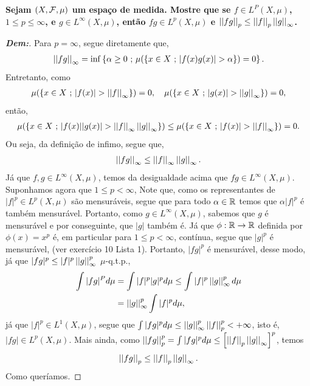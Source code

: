 \textbf{Sejam $(X, \mcal F, \mu)$ um espaço de medida. Mostre que se $f \in L^P(X, \mu)$, $1 \le p \le \infty$, 
e $g \in L^\infty(X, \mu)$, então $fg \in L^p(X, \mu)$ e $\pnorm p {fg} \le \pnorm p f \pnorm \infty g$.}
\begin{proof}[\textbf{Dem:}] Para $p = \infty$, segue diretamente que, 
  \begin{align*}
    \pnorm \infty {fg} = \inf \set{\alpha \ge 0 \st \mu(\set{x \in X \st |f(x)g(x)| > \alpha}) = 0}.
  \end{align*}
  Entretanto, como 
  \begin{align*}
    \mu(\set{x \in X \st |f(x)| > \pnorm \infty f}) = 0, \quad \mu(\set{x \in X \st |g(x)| > \pnorm \infty g}) = 0, 
  \end{align*}
  então, 
  \begin{align*}
    \mu(\set{x \in X \st |f(x)| |g(x)| > \pnorm \infty f \pnorm \infty g}) 
    \le \mu(\set{x \in X \st |f(x)| > \pnorm \infty f}) = 0.
  \end{align*}
  Ou seja, da definição de infimo, segue que, 
  \begin{align*}
    \pnorm \infty {fg} \le \pnorm \infty f \pnorm \infty g.
  \end{align*}
  Já que $f, g \in L^\infty(X, \mu)$, temos da desigualdade acima que $fg \in L^\infty(X, \mu)$. \\ 
  Suponhamos agora que $ 1 \le p < \infty$, Note que, como os representantes 
  de $|f|^p \in L^p(X, \mu)$ são mensuráveis, segue que para todo $\alpha \in \bR$
  temos que $\alpha |f|^p$ é também mensurável.
  Portanto, como $g \in L^\infty(X, \mu)$, sabemos que $g$ é mensurável e 
  por conseguinte, que $|g|$ também é. Já que $\phi: \bR \rightarrow \bR$ definida 
  por $\phi(x) = x^p$ é, em particular para $1 \le p < \infty$, contínua, 
  segue que $|g|^p$ é mensurável, (ver exercício 10 Lista 1). Portanto, 
  $|fg|^p$ é mensurável, desse modo, já que $|fg|^p \le |f|^p\pnorm \infty g ^p$ $\mu$-q.t.p.,
  \begin{align*}
    \int |fg|^P d\mu &= \int |f|^p |g|^p d\mu \le \int |f|^p \pnorm \infty g^p d\mu \\ 
    &= \pnorm \infty g^p \int |f|^p d\mu,
  \end{align*}
  já que $|f|^p \in L^1(X, \mu)$, segue que $\int |fg|^p d\mu \le \pnorm \infty g^p 
  \pnorm p f^p < +\infty$, isto é, $|fg| \in L^p(X, \mu)$. Mais ainda, 
  como $\pnorm p {fg}^p = \int |fg|^p d\mu \le \cparth{\pnorm p f \pnorm \infty g}^p$,
  temos 
  $$\pnorm p {fg} \le \pnorm p f \pnorm \infty g.$$ 
  Como queríamos.
\end{proof}

